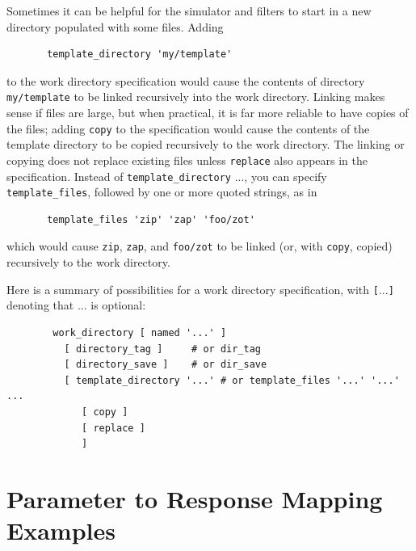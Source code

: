Sometimes it can be helpful for the simulator and filters to start in a
new directory populated with some files.  Adding
\begin{small}
\begin{verbatim}
       template_directory 'my/template'
\end{verbatim}
\end{small}
to the work directory specification would cause the
contents of directory \texttt{my/template} to be linked recursively
into the work directory.  Linking makes sense if files are large,
but when practical, it is far more reliable to have
copies of the files; adding \texttt{copy} to the specification
would cause the contents of the template directory to be copied
recursively to the work directory.  The linking or copying does
not replace existing files unless \texttt{replace} also appears
in the specification.  Instead of \texttt{template\_directory} $...$,
you can specify \texttt{template\_files}, followed by one or more
quoted strings, as in
\begin{small}
\begin{verbatim}
       template_files 'zip' 'zap' 'foo/zot'
\end{verbatim}
\end{small}
which would cause \texttt{zip}, \texttt{zap}, and \texttt{foo/zot} to
be linked (or, with \texttt{copy}, copied) recursively to the work
directory.

Here is a summary of possibilities for a work directory specification,
with {\tt\verb=[=$...$\verb=]=} denoting that $...$ is optional:
\begin{small}
\begin{verbatim}
        work_directory [ named '...' ]
          [ directory_tag ]     # or dir_tag
          [ directory_save ]    # or dir_save
          [ template_directory '...' # or template_files '...' '...' ...
             [ copy ]
             [ replace ]
             ]
\end{verbatim}
\end{small}

\section{Parameter to Response Mapping Examples}\label{interfaces:mappings}

